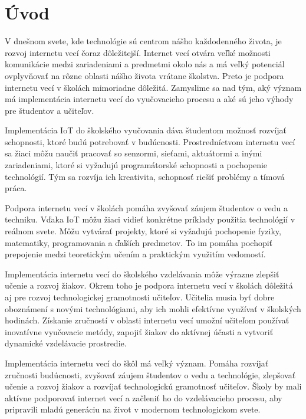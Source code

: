 
{}

\chapter*{Úvod}

V dnešnom svete, kde technológie sú centrom nášho každodenného života, je rozvoj internetu vecí čoraz dôležitejší. Internet vecí otvára veľké možnosti komunikácie medzi zariadeniami a predmetmi okolo nás a má veľký potenciál ovplyvňovať na rôzne oblasti nášho života vrátane školstva. Preto je podpora internetu vecí v školách mimoriadne dôležitá. Zamyslime sa nad tým, aký význam má implementácia internetu vecí do vyučovacieho procesu a aké sú jeho výhody pre študentov a učiteľov.

Implementácia IoT do školského vyučovania dáva študentom možnosť rozvíjať schopnosti, ktoré budú potrebovať v budúcnosti. Prostredníctvom internetu vecí sa žiaci môžu naučiť pracovať so senzormi, sieťami, aktuátormi a inými zariadeniami, ktoré si vyžadujú programátorské schopnosti a pochopenie technológií. Tým sa rozvíja ich kreativita, schopnosť riešiť problémy a tímová práca.

Podpora internetu vecí v školách pomáha zvyšovať záujem študentov o vedu a techniku. Vďaka IoT môžu žiaci vidieť konkrétne príklady použitia technológií v reálnom svete. Môžu vytvárať projekty, ktoré si vyžadujú pochopenie fyziky, matematiky, programovania a ďalších predmetov. To im pomáha pochopiť prepojenie medzi teoretickým učením a praktickým využitím vedomostí.

Implementácia internetu vecí do školského vzdelávania môže výrazne zlepšiť učenie a rozvoj žiakov. Okrem toho je podpora internetu vecí v školách dôležitá aj pre rozvoj technologickej gramotnosti učiteľov. Učitelia musia byť dobre oboznámení s novými technológiami, aby ich mohli efektívne využívať v školských hodinách. Získanie zručností v oblasti internetu vecí umožní učiteľom používať inovatívne vyučovacie metódy, zapojiť žiakov do aktívnej účasti a vytvoriť dynamické vzdelávacie prostredie.

Implementácia internetu vecí do škôl má veľký význam. Pomáha rozvíjať zručnosti budúcnosti, zvyšovať záujem študentov o vedu a technológie, zlepšovať učenie a rozvoj žiakov a rozvíjať technologickú gramotnosť učiteľov. Školy by mali aktívne podporovať internet vecí a začleniť ho do vzdelávacieho procesu, aby pripravili mladú generáciu na život v modernom technologickom svete.

